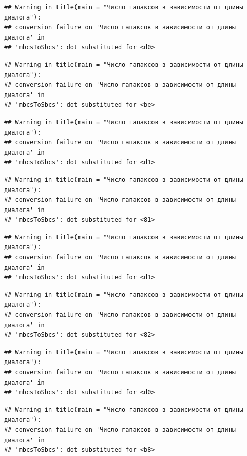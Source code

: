 \documentclass[
]{book}
\theoremstyle{definition}
\theoremstyle{definition}
\theoremstyle{definition}
\theoremstyle{definition}
\theoremstyle{remark}
\begin{document}
\begin{verbatim}
## Warning in title(main = "Число гапаксов в зависимости от длины диалога"):
## conversion failure on 'Число гапаксов в зависимости от длины диалога' in
## 'mbcsToSbcs': dot substituted for <d0>
\end{verbatim}

\begin{verbatim}
## Warning in title(main = "Число гапаксов в зависимости от длины диалога"):
## conversion failure on 'Число гапаксов в зависимости от длины диалога' in
## 'mbcsToSbcs': dot substituted for <be>
\end{verbatim}

\begin{verbatim}
## Warning in title(main = "Число гапаксов в зависимости от длины диалога"):
## conversion failure on 'Число гапаксов в зависимости от длины диалога' in
## 'mbcsToSbcs': dot substituted for <d1>
\end{verbatim}

\begin{verbatim}
## Warning in title(main = "Число гапаксов в зависимости от длины диалога"):
## conversion failure on 'Число гапаксов в зависимости от длины диалога' in
## 'mbcsToSbcs': dot substituted for <81>
\end{verbatim}

\begin{verbatim}
## Warning in title(main = "Число гапаксов в зависимости от длины диалога"):
## conversion failure on 'Число гапаксов в зависимости от длины диалога' in
## 'mbcsToSbcs': dot substituted for <d1>
\end{verbatim}

\begin{verbatim}
## Warning in title(main = "Число гапаксов в зависимости от длины диалога"):
## conversion failure on 'Число гапаксов в зависимости от длины диалога' in
## 'mbcsToSbcs': dot substituted for <82>
\end{verbatim}

\begin{verbatim}
## Warning in title(main = "Число гапаксов в зависимости от длины диалога"):
## conversion failure on 'Число гапаксов в зависимости от длины диалога' in
## 'mbcsToSbcs': dot substituted for <d0>
\end{verbatim}

\begin{verbatim}
## Warning in title(main = "Число гапаксов в зависимости от длины диалога"):
## conversion failure on 'Число гапаксов в зависимости от длины диалога' in
## 'mbcsToSbcs': dot substituted for <b8>
\end{verbatim}
\end{document}
